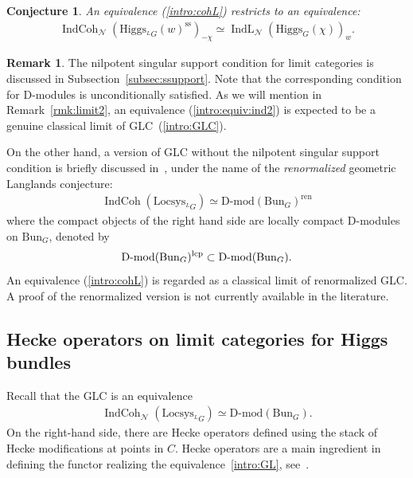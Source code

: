 \documentclass [11pt,oneside,a4paper,mathscr]{amsart}
\newtheorem{conj}[thm]{Conjecture}
\theoremstyle{definition}
\newtheorem{remark}[thm]{Remark}
\newcommand{\IndCoh}{\operatorname{IndCoh}}
\newcommand{\IndL}{\operatorname{IndL}}
\newcommand{\Hig}{\mathrm{Higgs}}
\newcommand{\Bun}{\mathrm{Bun}}
\begin{document}
\begin{conj}\label{conj:Higgs2} 
An equivalence (\ref{intro:cohL}) 
restricts to an equivalence:
\begin{align}\label{intro:equiv:ind2} \IndCoh_{\mathcal{N}}(\Hig_{^{L}G}(w)^{\mathrm{ss}})_{-\chi} \simeq \IndL_{\mathcal{N}}(\Hig_{G}(\chi))_{w}. 
\end{align} 
\end{conj}

\begin{remark}\label{rmk:conj} 
The nilpotent singular support condition for limit categories is discussed in Subsection~\ref{subsec:ssupport}.
Note that the corresponding condition for D-modules is unconditionally 
satisfied. %
As we will mention in Remark~\ref{rmk:limit2}, an equivalence (\ref{intro:equiv:ind2}) is expected
to be a genuine classical limit of GLC~(\ref{intro:GLC}). 

On the other hand, a version of GLC without the nilpotent singular support condition is briefly discussed in~\cite[Remark~1.6.9]{GLC1}, under the name of the \textit{renormalized} geometric Langlands conjecture:
\begin{align*}
    \IndCoh(\mathrm{Locsys}_{^LG}) \simeq \text{D-mod}(\Bun_G)^{\mathrm{ren}}
\end{align*}
where the compact objects of the right hand side are locally compact D-modules on $\Bun_G$, denoted by 
\begin{align*}
    \text{D-mod}(\Bun_G)^{\rm{lcp}} \subset \text{D-mod}(\Bun_G).
\end{align*}
An equivalence (\ref{intro:cohL}) is regarded as a classical limit of renormalized GLC. 
A proof of the renormalized version is not currently available in the literature.
\end{remark}




\subsection{Hecke operators on limit categories for Higgs bundles}\label{subsec:Heckeoperators}
Recall that the GLC is an equivalence 
\begin{align}\label{intro:GL}
    \IndCoh_{\mathcal{N}}(\mathrm{Locsys}_{^{L}G}) \simeq \text{D-mod}(\Bun_{G}). 
\end{align}
On the right-hand side, there are Hecke operators defined 
using the stack of Hecke modifications at points in $C$. Hecke operators are a main ingredient in defining the functor realizing the equivalence~\eqref{intro:GL}, see~\cite{GLC1}. 
\end{document}

